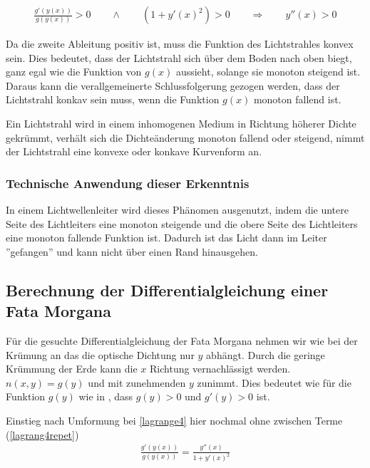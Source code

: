 \begin{align}
	\frac{g'(y(x))}{g(y(x))} > 0 \qquad \wedge \qquad (1 + y'(x)^2) > 0 \qquad \Rightarrow \qquad y''(x) > 0
	\label{krümmungAuswertung}
\end{align}

Da die zweite Ableitung positiv ist, muss die Funktion des Lichtstrahles konvex sein.
Dies bedeutet, dass der Lichtstrahl sich über dem Boden nach oben biegt, ganz egal wie die Funktion von $g(x)$ aussieht, solange sie monoton steigend ist.
Daraus kann die verallgemeinerte Schlussfolgerung gezogen werden, dass der Lichtstrahl konkav sein muss, wenn die Funktion $g(x)$ monoton fallend ist.
\begin{definition}
Ein Lichtstrahl wird in einem inhomogenen Medium in Richtung höherer Dichte gekrümmt, verhält sich die Dichteänderung monoton fallend oder steigend, nimmt der Lichtstrahl eine konvexe oder konkave Kurvenform an.
\end{definition}

\subsubsection{Technische Anwendung dieser Erkenntnis}
In einem Lichtwellenleiter wird dieses Phänomen ausgenutzt, indem die untere Seite des Lichtleiters eine monoton steigende
und die obere Seite des Lichtleiters eine monoton fallende Funktion ist. 
Dadurch ist das Licht dann im Leiter ''gefangen'' und kann nicht über einen Rand hinausgehen.

\subsection{Berechnung der Differentialgleichung einer Fata Morgana}

Für die gesuchte Differentialgleichung der Fata Morgana nehmen wir wie bei der Krümung an das die optische Dichtung nur $y$ abhängt. Durch die geringe Krümmung der Erde kann die $x$ Richtung vernachlässigt werden.
$n(x,y) = g(y)$ und mit zunehmenden $y$ zunimmt. Dies bedeutet wie für die Funktion $g(y)$ wie in , dass $g(y) > 0$ und $g'(y) > 0 $ ist.

Einstieg nach Umformung bei \eqref{lagrange4} hier nochmal ohne zwischen Terme (\eqref{lagrang4repet})
\begin{align}
	\frac{g'(y(x))}{g(y(x))} = \frac{y''(x)}{1 + y'(x)^2}
	\label{lagrang4repet}
\end{align}

